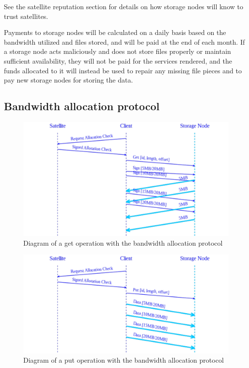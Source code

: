 \documentclass[11pt,fleqn,openany]{book}
\begin{document}
See the satellite reputation section for details on
how storage nodes will know to trust satellites.

Payments to storage nodes will be calculated on a daily basis based on the
bandwidth
utilized and files stored, and will be paid at the end of each month.
If a storage node acts
maliciously and does not store files properly or maintain sufficient
availability, they will not be paid for the services rendered, and the funds
allocated to it will instead be used to repair any missing
file pieces and to pay new storage nodes for storing the data.

\subsection{Bandwidth allocation protocol}\label{bap}

\begin{figure}
\centering
\includegraphics[width=\textwidth]{diagram-drafts/bandwidth-allocation/bandwidth-get.pdf}
\caption{Diagram of a get operation with the bandwidth allocation protocol}
\label{fig:bap-get}
\end{figure}

\begin{figure}
\centering
\includegraphics[width=\textwidth]{diagram-drafts/bandwidth-allocation/bandwidth-put.pdf}
\caption{Diagram of a put operation with the bandwidth allocation protocol}
\label{fig:bap-put}
\end{figure}
\end{document}
